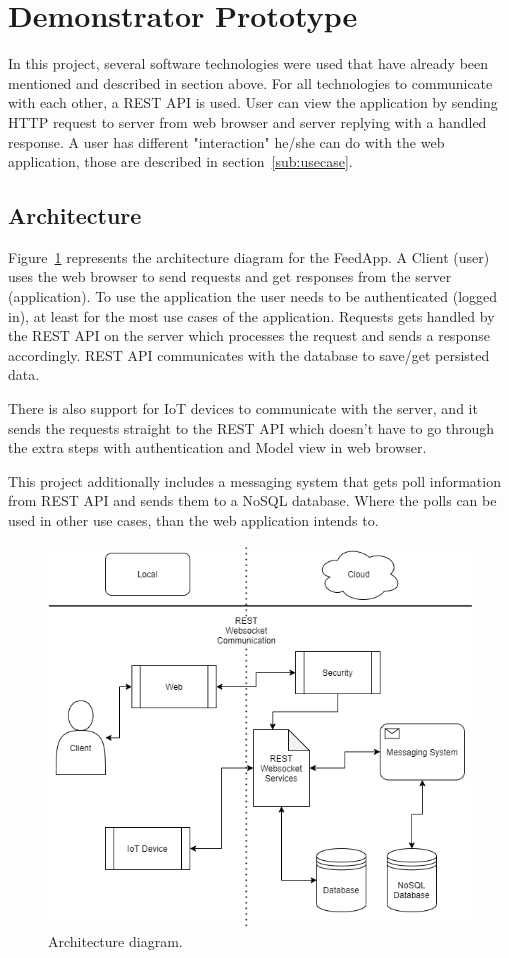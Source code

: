 \section{Demonstrator Prototype}
\label{sec:design}

In this project, several software technologies were used that have already been mentioned and described in section above. For all technologies to communicate with each other, a REST API is used. User can view the application by sending HTTP request to server from web browser and server replying with a handled response. A user has different "interaction" he/she can do with the web application, those are described in section~\ref{sub:usecase}.

\subsection{Architecture}
\label{sub:architeure}
Figure~\ref{fig:archdiagram} represents the architecture diagram for the FeedApp.
A Client (user) uses the web browser to send requests and get responses from the server (application). To use the application the user needs to be authenticated (logged in), at least for the most use cases of the application. Requests gets handled by the REST API on the server which processes the request and sends a response accordingly. REST API communicates with the database to save/get persisted data.

There is also support for IoT devices to communicate with the server, and it sends the requests straight to the REST API which doesn't have to go through the extra steps with authentication and Model view in web browser.

This project additionally includes a messaging system that gets poll information from REST API and sends them to a NoSQL database. Where the polls can be used in other use cases, than the web application intends to.
\begin{figure}[H]
  \centering
  \includegraphics[scale=0.5]{figs/archdiagram.png}
  \caption[scale=0.5]{Architecture diagram.}
  \label{fig:archdiagram}
\end{figure}

